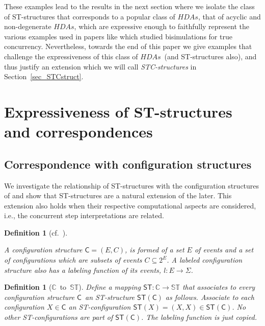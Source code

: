 \documentclass[submission,copyright,creativecommons]{eptcs}
\newtheorem{definition}[theorem]{Definition}
\newcommand\HDAs{\ensuremath{\mathit{HDAs}}}
\newcommand\C{\ensuremath{\mathsf{C}}}
\newcommand\allC{\ensuremath{\mathbb{C}}}
\newcommand\allST{\ensuremath{\mathbb{ST}}}
\newcommand\cintost{\ensuremath{\mathsf{ST}}}
\begin{document}
These examples lead to the results in the next section where we isolate the class of ST-structures that corresponds to a popular class of \HDAs, that of acyclic and non-degenerate \HDAs, which are expressive enough to faithfully represent the various examples used in papers like \cite{GlabbeekV97splitting,GlabbeekG01refinement,BaldanC10concur,phillips11express} which studied bisimulations for true concurrency. Nevertheless, towards the end of this paper we give examples that challenge the expressiveness of this class of \HDAs\ (and ST-structures also), and thus justify an extension which we will call \textit{STC-structures} in Section~\ref{sec_STCstruct}. 



\section{Expressiveness of ST-structures and correspondences}\label{subsec_expressST}



\subsection{Correspondence with configuration structures}\label{subsec_configStruct}

We investigate the relationship of ST-structures with the configuration structures of \cite{GlabbeekP95config,GlabbeekP09configStruct} and show that ST-structures are a natural extension of the later. This extension also holds when their respective computational aspects are considered, i.e., the concurrent step interpretations are related.

\begin{definition}[{cf.~\cite[Def.5.1]{GlabbeekG01refinement}\cite[Def.1.1]{GlabbeekP09configStruct}}]\label{def_configurationStruct}\ 

A \textit{configuration structure} $\C=(E,C)$, is formed of a set $E$ of \textit{events} and a set of configurations which are subsets of events $C\subseteq 2^{E}$. A \emph{labeled} configuration structure also has a labeling function of its events, $l:E\rightarrow\Sigma$.
\end{definition}


\begin{definition}[\allC\ to\ \allST]\label{def_confInST}
Define a mapping $\cintost:\allC\rightarrow\allST$ that associates to every configuration structure \C\ an ST-structure $\cintost(\C)$ as follows.
Associate to each configuration $X\in\C$ an ST-configuration $\cintost(X)=(X,X)\in\cintost(\C)$. No other ST-configurations are part of $\cintost(\C)$. 
The labeling function is just copied.
\end{definition}
\end{document}
